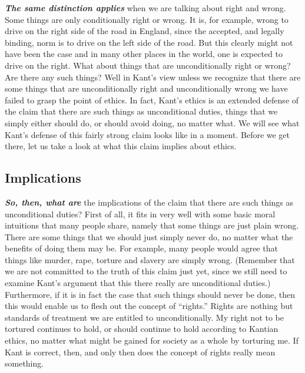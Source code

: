 \documentclass[
  12pt, openany]{book}
\theoremstyle{definition}
\theoremstyle{definition}
\theoremstyle{definition}
\theoremstyle{definition}
\theoremstyle{remark}
\begin{document}
\textbf{\emph{The same distinction applies}} when we are talking about right and wrong. Some things are only conditionally right or wrong. It is, for example, wrong to drive on the right side of the road in England, since the accepted, and legally binding, norm is to drive on the left side of the road. But this clearly might not have been the case and in many other places in the world, one is expected to drive on the right. What about things that are unconditionally right or wrong? Are there any such things? Well in Kant's view unless we recognize that there are some things that are unconditionally right and unconditionally wrong we have failed to grasp the point of ethics. In fact, Kant's ethics is an extended defense of the claim that there are such things as unconditional duties, things that we simply either should do, or should avoid doing, no matter what. We will see what Kant's defense of this fairly strong claim looks like in a moment. Before we get there, let us take a look at what this claim implies about ethics.

\hypertarget{implications}{%
\subsection*{Implications}\label{implications}}


\textbf{\emph{So, then, what are}} the implications of the claim that there are such things as unconditional duties? First of all, it fits in very well with some basic moral intuitions that many people share, namely that some things are just plain wrong. There are some things that we should just simply never do, no matter what the benefits of doing them may be. For example, many people would agree that things like murder, rape, torture and slavery are simply wrong. (Remember that we are not committed to the truth of this claim just yet, since we still need to examine Kant's argument that this there really are unconditional duties.) Furthermore, if it is in fact the case that such things should never be done, then this would enable us to flesh out the concept of ``rights.'' Rights are nothing but standards of treatment we are entitled to unconditionally. My right not to be tortured continues to hold, or should continue to hold according to Kantian ethics, no matter what might be gained for society as a whole by torturing me. If Kant is correct, then, and only then does the concept of rights really mean something.
\end{document}

